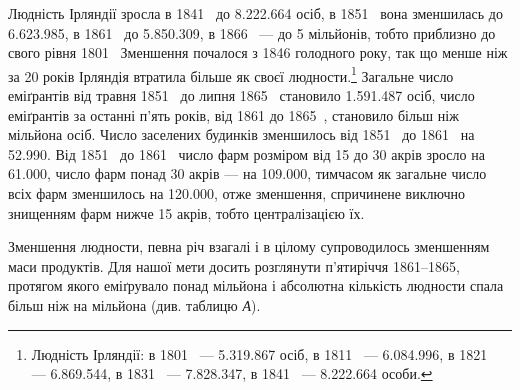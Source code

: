 Людність Ірляндії зросла в 1841~ до \num{8.222.664} осіб, в 1851~
вона зменшилась до \num{6.623.985}, в 1861~ до \num{5.850.309}, в 1866~ —
до 5 мільйонів, тобто приблизно до свого рівня 1801~ Зменшення
почалося з 1846 голодного року, так що менше ніж за
20 років Ірляндія втратила більше як  своєї людности.\footnote{
Людність Ірляндії: в 1801~ — \num{5.319.867} осіб, в 1811~ — \num{6.084.996},
в 1821~ — \num{6.869.544}, в 1831~ — \num{7.828.347}, в 1841~ — \num{8.222.664} особи.
}
Загальне число еміґрантів від травня 1851~ до липня 1865~
становило \num{1.591.487} осіб, число еміґрантів за останні п’ять років,
від 1861 до 1865~, становило більш ніж  мільйона осіб. Число
заселених будинків зменшилось від 1851~ до 1861~ на \num{52.990}.
Від 1851~ до 1861~ число фарм розміром від 15 до 30 акрів зросло
на \num{61.000}, число фарм понад 30 акрів — на \num{109.000}, тимчасом
як загальне число всіх фарм зменшилось на \num{120.000}, отже зменшення,
спричинене виключно знищенням фарм нижче 15 акрів,
тобто централізацією їх.

Зменшення людности, певна річ взагалі і в цілому супроводилось
зменшенням маси продуктів. Для нашої мети досить
розглянути п’ятиріччя 1861--1865, протягом якого еміґрувало
понад  мільйона і абсолютна кількість людности спала
більш ніж на  мільйона (див. таблицю \emph{А}).

